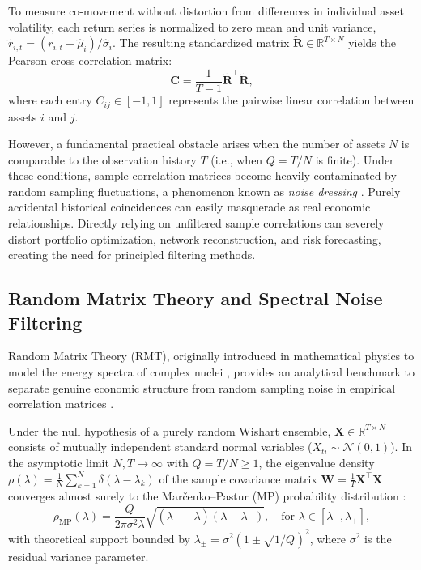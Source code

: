 To measure co-movement without distortion from differences in individual asset volatility, each return series is normalized to zero mean and unit variance, $\widetilde{r}_{i,t} = (r_{i,t} - \widehat{\mu}_i)/\widehat{\sigma}_i$. The resulting standardized matrix $\widetilde{\mathbf{R}} \in \mathbb{R}^{T \times N}$ yields the Pearson cross-correlation matrix:
\begin{equation}
\mathbf{C} = \frac{1}{T-1} \widetilde{\mathbf{R}}^{\top} \widetilde{\mathbf{R}},
\label{eq:theory_corr_matrix}
\end{equation}
where each entry $C_{ij} \in [-1, 1]$ represents the pairwise linear correlation between assets $i$ and $j$.

However, a fundamental practical obstacle arises when the number of assets $N$ is comparable to the observation history $T$ (i.e., when $Q = T/N$ is finite). Under these conditions, sample correlation matrices become heavily contaminated by random sampling fluctuations, a phenomenon known as \emph{noise dressing} \cite{laloux_1999_noise}. Purely accidental historical coincidences can easily masquerade as real economic relationships. Directly relying on unfiltered sample correlations can severely distort portfolio optimization, network reconstruction, and risk forecasting, creating the need for principled filtering methods.

\subsection{Random Matrix Theory and Spectral Noise Filtering}
\label{subsec:theory_rmt}

Random Matrix Theory (RMT), originally introduced in mathematical physics to model the energy spectra of complex nuclei \cite{guhr_muller_1998}, provides an analytical benchmark to separate genuine economic structure from random sampling noise in empirical correlation matrices \cite{laloux_1999_noise,plerou_2002_random}.

Under the null hypothesis of a purely random Wishart ensemble, $\mathbf{X} \in \mathbb{R}^{T \times N}$ consists of mutually independent standard normal variables ($X_{ti} \sim \mathcal{N}(0, 1)$). In the asymptotic limit $N, T \to \infty$ with $Q = T/N \ge 1$, the eigenvalue density $\rho(\lambda) = \frac{1}{N}\sum_{k=1}^N \delta(\lambda - \lambda_k)$ of the sample covariance matrix $\mathbf{W} = \frac{1}{T}\mathbf{X}^{\top}\mathbf{X}$ converges almost surely to the Mar\v{c}enko--Pastur (MP) probability distribution \cite{marcenko_1967_distribution}:
\begin{equation}
\rho_{\mathrm{MP}}(\lambda) = \frac{Q}{2\pi \sigma^2 \lambda} \sqrt{(\lambda_+ - \lambda)(\lambda - \lambda_-)}, \quad \text{for } \lambda \in [\lambda_-, \lambda_+],
\label{eq:theory_marcenko_pastur}
\end{equation}
with theoretical support bounded by $\lambda_{\pm} = \sigma^2 \left(1 \pm \sqrt{1/Q}\right)^2$, where $\sigma^2$ is the residual variance parameter.

